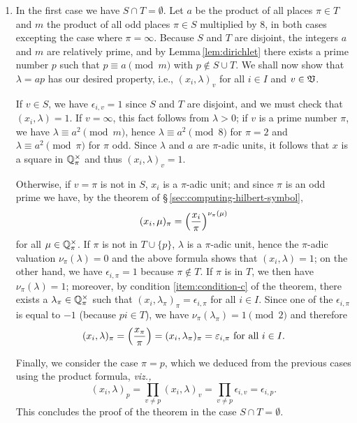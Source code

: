 \begin{enumerate}[nosep, label=(\roman*), wide]
    \item In the first case we have \(S \cap T = \emptyset\). Let \(a\) be the product of all places \(\pi \in T\) and \(m\) the product of all odd places \(\pi \in S\) multiplied by \(8\), in both cases excepting the case where \(\pi = \infty\). Because \(S\) and \(T\) are disjoint, the integers \(a\) and \(m\) are relatively prime, and by Lemma\,\ref{lem:dirichlet} there exists a prime number \(p\) such that \(p \equiv a \pmod{m}\) with \(p \notin S \cup T\). We shall now show that \(\lambda = ap\) has our desired property, i.e., \((x_i, \lambda)_v\) for all \(i \in I\) and \(v \in \mathfrak{V}\). 
    
    If \(v \in S\), we have \(\epsilon_{i, v} = 1\) since \(S\) and \(T\) are disjoint, and we must check that \((x_i, \lambda) = 1\). If \(v = \infty\), this fact follows from \(\lambda > 0\); if \(v\) is a prime number \(\pi\), we have \(\lambda \equiv a^2 \pmod{m}\), hence \(\lambda \equiv a^2 \pmod{8}\) for \(\pi = 2\) and \(\lambda \equiv a^2 \pmod{\pi}\) for \(\pi\) odd. Since \(\lambda\) and \(a\) are \(\pi\)-adic units, it follows that \(x\) is a square in \(\mathbb{Q}_{\pi}^{\times}\) and thus \((x_i, \lambda)_v = 1\).%

    Otherwise, if \(v = \pi\) is not in \(S\), \(x_i\) is a \(\pi\)-adic unit; and since \(\pi\) is an odd prime we have, by the theorem of \S\,\ref{sec:computing-hilbert-symbol},
    \[
        (x_i, \mu)_{\pi} = \left(\frac{x_i}{\pi}\right)^{\nu_\pi(\mu)}
    \]
    for all \(\mu \in \mathbb{Q}_{\pi}^{\times}\). If \(\pi\) is not in \(T \cup \{p\}\), \(\lambda\) is a \(\pi\)-adic unit, hence the \(\pi\)-adic valuation \(\nu_{\pi}(\lambda) = 0\) and the above formula shows that \((x_i, \lambda) = 1\); on the other hand, we have \(\epsilon_{i, \pi} = 1\) because \(\pi \notin T\). If \(\pi\) is in \(T\), we then have \(\nu_{\pi}(\lambda) = 1\); moreover, by condition {\normalfont\ref{item:condition-c}} of the theorem, there exists a \(\lambda_{\pi} \in \mathbb{Q}_{\pi}^{\times}\) such that \((x_i, \lambda_{\pi})_{\pi} = \epsilon_{i, \pi}\) for all \(i \in I\). Since one of the \(\epsilon_{i, \pi}\) is equal to \(-1\) (because \(pi \in T\)), we have \(\nu_\pi(\lambda_\pi) = 1 \pmod{2}\) and therefore
    \[
        (x_i, \lambda)_{\pi} = \left(\frac{x_\pi}{\pi}\right) = (x_i, \lambda_{\pi})_{\pi} = \varepsilon_{i, \pi} \text{ for all } i \in I.
    \]

    Finally, we consider the case \(\pi = p\), which we deduced from the previous cases using the product formula, \emph{viz.,}
    \[
        (x_i, \lambda)_p = \prod_{v \neq p} (x_i, \lambda)_v = \prod_{v \neq p} \epsilon_{i, v} = \epsilon_{i, p}.
    \]
    This concludes the proof of the theorem in the case \(S \cap T = \emptyset\).


\end{enumerate}
